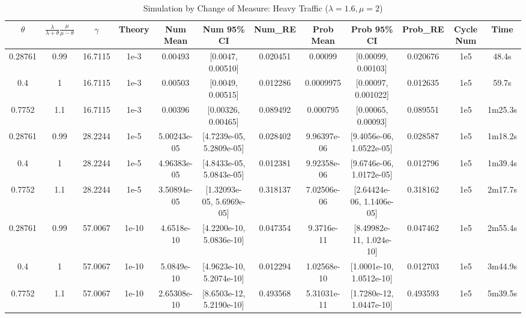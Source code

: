 \documentclass{article}
\begin{document}
\begin{table}[!htbp]
    \tiny
	\centering
	\begin{tabularx}{1.09\textwidth}{cccccccccccc}
		\toprule
        $\theta$
		& $\frac{\lambda}{\lambda + \theta} \frac{\mu}{\mu - \theta}$
		& $\gamma$
		& Theory
		& Num Mean
		& Num 95\% CI
		& Num\_RE
		& Prob Mean
		& Prob 95\% CI
		& Prob\_RE
		& Cycle Num
        & Time\\

        \midrule
        0.28761
        & 0.99
        & 16.7115
		& 1e-3
		& 0.00493
		& [0.0047, 0.00510]
		& 0.020451
		& 0.00099
		& [0.00099, 0.00103]
		& 0.020676
		& 1e5
		& 48.4s

        \\
        \midrule
        0.4
        & 1
        & 16.7115
		& 1e-3
		& 0.00503
		& [0.0049, 0.00515]
		& 0.012286
		& 0.0009975
		& [0.00097, 0.001022]
		& 0.012635
		& 1e5
		& 59.7s
        \\
		
        \midrule
        0.7752
        & 1.1
        & 16.7115
		& 1e-3
		& 0.00396
		& [0.00326, 0.00465]
		& 0.089492
		& 0.000795
		& [0.00065, 0.00093]
		& 0.089551
		& 1e5
		& 1m25.3s
        \\
		\midrule
        0.28761
        & 0.99
        & 28.2244
		& 1e-5
		& 5.00243e-05
		& [4.7239e-05, 5.2809e-05]
		& 0.028402
		& 9.96397e-06
		& [9.4056e-06, 1.0522e-05]
		& 0.028587
		& 1e5
		& 1m18.2s
        \\
		\midrule
        0.4
        & 1
        & 28.2244
		& 1e-5
		& 4.96383e-05
		& [4.8433e-05, 5.0843e-05]
		& 0.012381
		& 9.92358e-06
		& [9.6746e-06, 1.0172e-05]
		& 0.012796
		& 1e5
		& 1m39.4s
        \\
		\midrule
        0.7752
        & 1.1
        & 28.2244
		& 1e-5
		& 3.50894e-05
		& [1.32093e-05, 5.6969e-05]
		& 0.318137
		& 7.02506e-06
		& [2.64424e-06, 1.1406e-05]
		& 0.318162
		& 1e5
		& 2m17.7s
        \\
		\midrule
        0.28761
        & 0.99
        & 57.0067
		& 1e-10
		& 4.6518e-10
		& [4.2200e-10, 5.0836e-10]
		& 0.047354
		& 9.3716e-11
		& [8.49982e-11, 1.024e-10]
		& 0.047462
		& 1e5
		& 2m55.4s
        \\
		\midrule
        0.4
        & 1
        & 57.0067
		& 1e-10
		& 5.0849e-10
		& [4.9623e-10, 5.2074e-10]
		& 0.012294
		& 1.02568e-10
		& [1.0001e-10, 1.0512e-10]
		& 0.012703
		& 1e5
		& 3m44.9s
        \\
		\midrule
        0.7752
        & 1.1
        & 57.0067
		& 1e-10
		& 2.65308e-10
		& [8.6503e-12, 5.2190e-10]
		& 0.493568
		& 5.31031e-11
		& [1.7280e-12, 1.0447e-10]
		& 0.493593
		& 1e5
		& 5m39.5s
        \\
		\bottomrule
	\end{tabularx}%
	\label{tab:tab5}%
	\caption{Simulation by Change of Measure: Heavy Traffic ($\lambda = 1.6, \mu = 2$)}
\end{table}%
\end{document}
